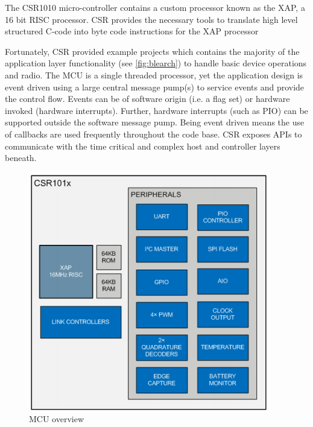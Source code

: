 \documentclass[]{article}
\begin{document}
The CSR1010 micro-controller contains a custom processor known as the XAP, a 16 bit \ac{RISC} processor. \ac{CSR} provides the necessary tools to translate high level structured C-code into byte code instructions for the XAP processor

Fortunately, \ac{CSR} provided example projects which contains the majority of the application layer functionality (see \ref{fig:blearch}) to handle basic device operations and radio. The \ac{MCU} is a single threaded processor, yet the application design is event driven using a large central message pump(s) to service events and provide the control flow. Events can be of software origin (i.e. a flag set) or hardware invoked (hardware interrupts). Further, hardware interrupts (such as PIO) can be supported outside the software message pump. Being event driven means the use of callbacks are used frequently throughout the code base. \ac{CSR} exposes \ac{API}s to communicate with the time critical and complex host and controller layers beneath.


\begin{figure}[htb]
	\begin{center}
		\includegraphics{mcu}
	\end{center}
	\caption{MCU overview \cite{firmwaredev}}
	\label{fig:mcu}
\end{figure}
\end{document}

